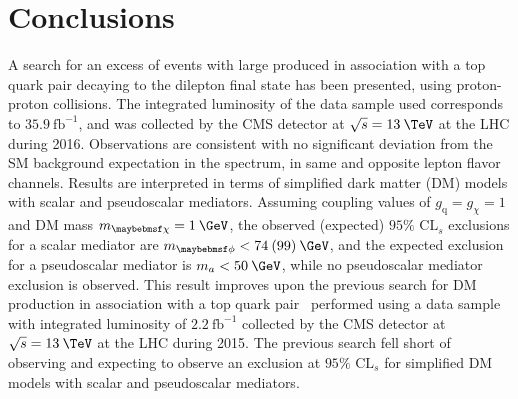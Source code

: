 \chapter{Conclusions}
\label{chap:conclusions}

\doublespacing
A search for an excess of events with large \ptmiss produced in association with a top quark pair decaying to the dilepton final state has been presented, using proton-proton collisions. The integrated luminosity of the data sample used corresponds to $35.9\:\textrm{fb}^{-1}$, and was collected by the CMS detector at $\sqrt{s}=13\:\TeV$ at the LHC during 2016. Observations are consistent with no significant deviation from the SM background expectation in the \ptmiss spectrum, in same and opposite lepton flavor channels. Results are interpreted in terms of simplified dark matter (DM) models with scalar and pseudoscalar mediators. Assuming coupling values of $g_{\textrm{q}} = g_{\chi} = 1$ and DM mass $m_{\chi} = 1\:\GeV$, the observed (expected) $95\%$ $\textrm{CL}_{s}$ exclusions for a scalar mediator are $m_{\phi} < 74\:(99)\:\GeV$, and the expected exclusion for a pseudoscalar mediator is $m_{a} < 50\:\GeV$, while no pseudoscalar mediator exclusion is observed. This result improves upon the previous search for DM production in association with a top quark pair~\cite{Sirunyan:2017xgm} performed using a data sample with integrated luminosity of $2.2\:\textrm{fb}^{-1}$ collected by the CMS detector at $\sqrt{s}=13\:\TeV$ at the LHC during 2015. The previous search fell short of observing and expecting to observe an exclusion at $95\%$ $\textrm{CL}_{s}$ for simplified DM models with scalar and pseudoscalar mediators.
